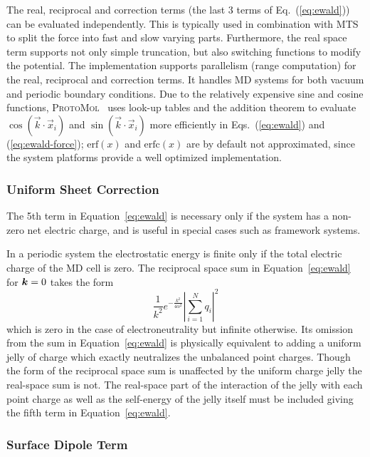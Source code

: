\documentclass[11pt]{article}
\newcommand{\ProtoMol}{\textsc{ProtoMol }}
\newcommand{\erf}{\mbox{erf}}
\newcommand{\erfc}{\mbox{erfc}}
\providecommand{\bm}[1]{\mbox{\boldmath${#1}$}}
\begin{document}
The real, reciprocal and correction terms (the
last 3 terms of Eq.\ (\ref{eq:ewald}))  can be
evaluated independently. This is typically used in combination with MTS to
split the force into fast and slow varying parts.
Furthermore, the real space term supports
not only simple truncation, but also switching functions to modify the
potential. The implementation supports parallelism (range computation)
for the real, reciprocal and correction terms. It handles MD systems for both vacuum and periodic boundary
conditions. Due to the relatively expensive sine and cosine functions,
\ProtoMol\ uses look-up tables and the addition theorem to evaluate
$\cos(\vec{k} \cdot \vec{x}_i)$ and $\sin(\vec{k} \cdot \vec{x}_i)$ 
more efficiently in Eqs.\ (\ref{eq:ewald}) and (\ref{eq:ewald-force});
$\erf(x)$ and $\erfc(x)$ are by default not approximated, since the
system platforms provide a well optimized implementation.

\subsubsection*{Uniform Sheet Correction}

The 5th term in Equation~\ref{eq:ewald} is necessary only if the system
has a non-zero net electric charge, and is useful in special cases such
as framework systems.  

In a periodic system the electrostatic energy is finite only if the
total electric charge of the MD cell is zero.  The reciprocal space
sum in Equation~\ref{eq:ewald} for $\bm{k}=0$ takes the form
\[\frac{1}{k^2}e^{-\frac{k^2}{4 \alpha^2}} \left | \sum_{i=1}^{N} q_i
 \right |^2\] which is zero in the case of electroneutrality but
infinite otherwise.  Its omission from the sum in
Equation~\ref{eq:ewald} is physically equivalent to adding a uniform
jelly of charge which exactly neutralizes the unbalanced point
charges.  Though the form of the reciprocal space sum is
unaffected by the uniform charge jelly the real-space sum is not.  The
real-space part of the interaction of the jelly with each point charge
as well as the self-energy of the jelly itself must be included giving
the fifth term in Equation~\ref{eq:ewald}.

\subsubsection*{Surface Dipole Term}
\end{document}

